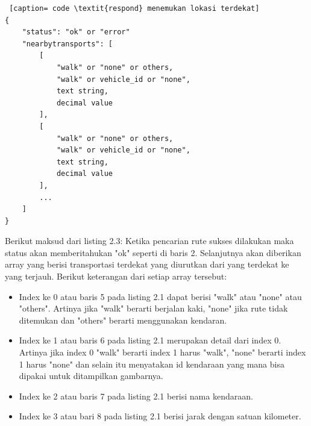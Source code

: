 \begin{lstlisting} [caption= code \textit{respond} menemukan lokasi terdekat]
{
    "status": "ok" or "error"
    "nearbytransports": [
        [
            "walk" or "none" or others,
            "walk" or vehicle_id or "none",
            text string,
            decimal value
        ],
        [
            "walk" or "none" or others,
            "walk" or vehicle_id or "none",
            text string,
            decimal value
        ],
        ...     
    ]
}\end{lstlisting}
Berikut maksud dari listing 2.3:
\hspace{0.5cm} Ketika pencarian rute sukses dilakukan maka status akan memberitahukan "ok" seperti di baris 2. Selanjutnya akan diberikan array yang berisi transportasi terdekat yang diurutkan dari yang terdekat ke yang terjauh. Berikut keterangan dari setiap array tersebut: 
\begin{itemize}
	\item Index ke 0 atau baris 5 pada listing 2.1 dapat berisi "walk" atau "none" atau "others". Artinya  jika "walk" berarti berjalan kaki, "none" jika rute tidak ditemukan dan "others" berarti menggunakan kendaran.
	\item Index ke 1 atau baris 6 pada listing 2.1 merupakan detail dari index 0. Artinya jika index 0 "walk" berarti index 1 harus "walk", "none" berarti index 1 harus "none" dan selain itu menyatakan id kendaraan yang mana bisa dipakai untuk ditampilkan gambarnya.
	\item Index ke 2 atau baris 7 pada listing 2.1 berisi nama kendaraan.
	\item Index ke 3 atau bari 8 pada listing 2.1 berisi jarak dengan satuan kilometer.
\end{itemize}